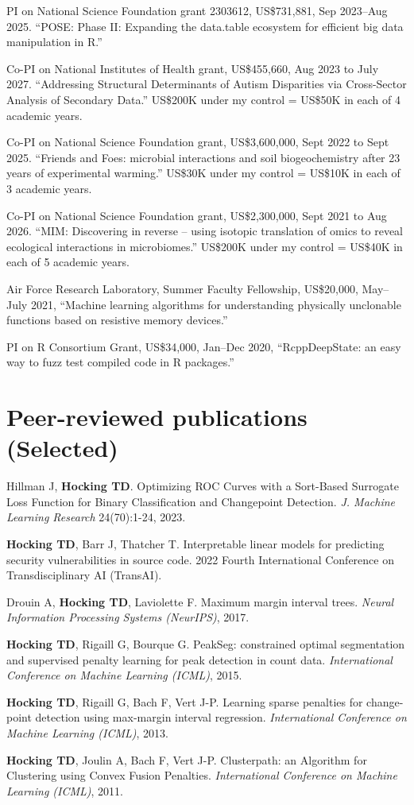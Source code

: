 \documentclass[margin,line]{res}
\begin{document}
\begin{resume}
PI on National Science Foundation grant 2303612, US\$731,881, Sep
2023--Aug 2025. ``POSE: Phase II: Expanding the data.table ecosystem
for efficient big data manipulation in R.''

Co-PI on National Institutes of Health grant, US\$455,660, Aug 2023 to
July 2027. ``Addressing Structural Determinants of Autism Disparities
via Cross-Sector Analysis of Secondary Data.'' US\$200K under my control =
US\$50K in each of 4 academic years.

Co-PI on National Science Foundation grant, US\$3,600,000, Sept 2022 to
Sept 2025. ``Friends and Foes: microbial interactions and soil
biogeochemistry after 23 years of experimental warming.'' 
US\$30K under my control = US\$10K in each of 3 academic years.

Co-PI on National Science Foundation grant, US\$2,300,000, Sept 2021
to Aug 2026. ``MIM: Discovering in reverse – using isotopic
translation of omics to reveal ecological interactions in
microbiomes.''  US\$200K under my control = US\$40K in
each of 5 academic years.

Air Force Research Laboratory, Summer Faculty Fellowship, US\$20,000,
May--July 2021, ``Machine learning algorithms for understanding
physically unclonable functions based on resistive memory devices.''

PI on R Consortium Grant, US\$34,000, Jan--Dec 2020, ``RcppDeepState: an easy
way to fuzz test compiled code in R packages.''

\section{\sc Peer-reviewed publications (Selected)}

Hillman J, {\bf Hocking TD}. Optimizing ROC Curves with a Sort-Based
Surrogate Loss Function for Binary Classification and Changepoint
Detection. {\it J. Machine Learning Research} 24(70):1-24, 2023.

{\bf Hocking TD}, Barr J, Thatcher T. Interpretable linear models for predicting security vulnerabilities in source code. 2022 Fourth International Conference on Transdisciplinary AI (TransAI). 

Drouin A, {\bf Hocking TD}, Laviolette F. Maximum margin interval
trees. {\it Neural Information Processing Systems (NeurIPS)}, 2017.

{\bf Hocking TD}, Rigaill G, Bourque G. PeakSeg: constrained optimal
segmentation and supervised penalty learning for peak detection in
count data. {\it International Conference on Machine Learning (ICML)},
2015.

{\bf Hocking TD}, Rigaill G, Bach F, Vert J-P. Learning sparse
penalties for change-point detection using max-margin interval
regression. {\it International Conference on Machine Learning (ICML)}, 2013.

{\bf Hocking TD}, Joulin A, Bach F, Vert J-P. Clusterpath: an
Algorithm for Clustering using Convex Fusion Penalties. {\it International Conference on Machine Learning (ICML)}, 2011.


\end{resume}
\end{document}

